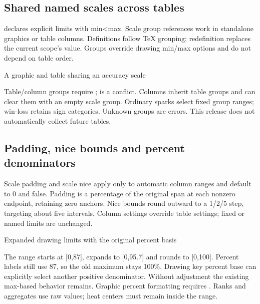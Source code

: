 \subsection{Shared named scales across tables}
 declares explicit limits with min<max.
Scale group references work in standalone graphics or table columns. Definitions
follow TeX grouping; redefinition replaces the current scope's value. Groups
override drawing min/max options and do not depend on table order.
\begin{demo}{A graphic and table sharing an accuracy scale}

\begin{gradtable}[style=academic,theme=violet,width=\linewidth,header align=c]
\end{gradtable}
\end{demo}
Table/column groups require ;  is a conflict. Columns
inherit table groups and can clear them with an empty scale group. Ordinary
sparks select fixed group ranges; win-loss retains sign categories. Unknown
groups are errors. This release does not automatically collect future tables.
\subsection{Padding, nice bounds and percent denominators}
Scale padding and scale nice apply only to automatic column ranges and default
to 0 and false. Padding is a percentage of the original span at each nonzero
endpoint, retaining zero anchors. Nice bounds round outward to a 1/2/5 step,
targeting about five intervals. Column settings override table settings; fixed
or named limits are unchanged.
\begin{demo}{Expanded drawing limits with the original percent basis}
\begin{gradtable}[style=compact,theme=forest,width=\linewidth,
  scale=column,scale padding=10,scale nice=true,header align=c]
\end{gradtable}
\end{demo}
The range starts at [0,87], expands to [0,95.7] and rounds to [0,100]. Percent
labels still use 87, so the old maximum stays 100\%. Drawing key percent base
can explicitly select another positive denominator. Without adjustment the
existing max-based behavior remains. Graphic percent formatting requires .
Ranks and aggregates use raw values; heat centers must remain inside the range.
